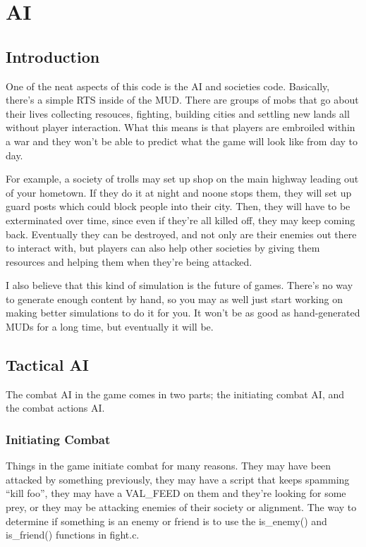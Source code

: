 \chapter{AI}

\section{Introduction}

One of the neat aspects of this code is the AI and societies
code. Basically, there's a simple RTS inside of the MUD. There are
groups of mobs that go about their lives collecting resouces,
fighting, building cities and settling new lands all without player
interaction. What this means is that players are embroiled within a
war and they won't be able to predict what the game will look like
from day to day. 

For example, a society of trolls may set up shop on
the main highway leading out of your hometown. If they do it at night
and noone stops them, they will set up guard posts which could block
people into their city. Then, they will have to be exterminated over
time, since even if they're all killed off, they may keep coming
back. Eventually they can be destroyed, and not only are their enemies
out there to interact with, but players can also help other societies
by giving them resources and helping them when they're being
attacked. 

I also believe that this kind of simulation is the future of games.
There's no way to generate enough content by hand, so you may as well
just start working on making better simulations to do it for you.
It won't be as good as hand-generated MUDs for a long time, but
eventually it will be.



\section{Tactical AI}

The combat AI in the game comes in two parts; the initiating combat
AI, and the combat actions AI.

\subsection{Initiating Combat}

Things in the game initiate combat for many reasons. They may have
been attacked by something previously, they may have a script that
keeps spamming ``kill foo'', they may have a VAL\_FEED on them and
they're looking for some prey, or they may be attacking enemies of
their society or alignment. The way to determine if something is an
enemy or friend is to use the is\_enemy() and is\_friend() functions
in fight.c.

